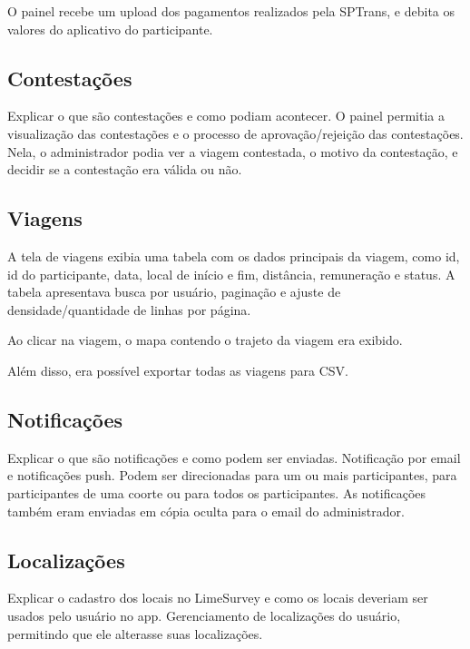 O painel recebe um upload dos pagamentos realizados pela SPTrans, e debita os valores
do aplicativo do participante.


\subsection{Contestações}
Explicar o que são contestações e como podiam acontecer.
O painel permitia a visualização das contestações e o processo de aprovação/rejeição
das contestações. Nela, o administrador podia ver a viagem contestada, o motivo da
contestação, e decidir se a contestação era válida ou não.


\subsection{Viagens}
A tela de viagens exibia uma tabela com os dados principais da viagem, como id,
id do participante, data, local de início e fim, distância, remuneração e status.
A tabela apresentava busca por usuário, paginação e ajuste de densidade/quantidade 
de linhas por página. 

Ao clicar na viagem, o mapa contendo o trajeto da viagem era exibido.

Além disso, era possível exportar todas as viagens para CSV.

\subsection{Notificações}
Explicar o que são notificações e como podem ser enviadas.
Notificação por email e notificações push.
Podem ser direcionadas para um ou mais participantes, para participantes de uma coorte 
ou para todos os participantes.
As notificações também eram enviadas em cópia oculta para o email do administrador.

\subsection{Localizações}
Explicar o cadastro dos locais no LimeSurvey e como os locais deveriam ser usados
pelo usuário no app.
Gerenciamento de localizações do usuário, permitindo que ele alterasse suas localizações.

